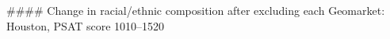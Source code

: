#### Change in racial/ethnic composition after excluding each Geomarket: Houston, PSAT score 1010–1520
